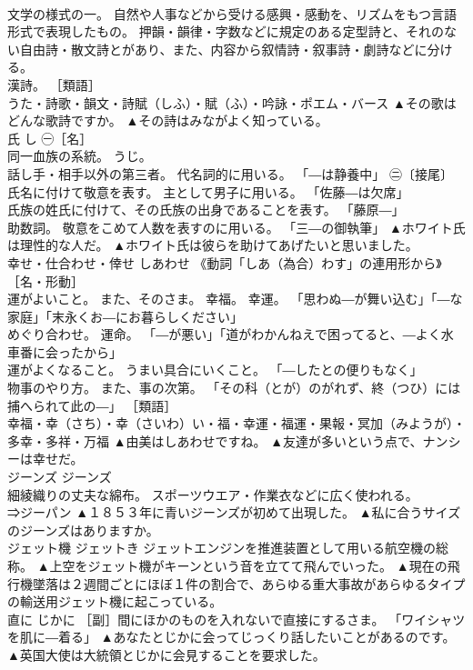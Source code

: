 \documentclass[8pt]{extreport}
\begin{document}
\begin{CJK}{UTF8}{min}
\\	文学の様式の一。 自然や人事などから受ける感興・感動を、リズムをもつ言語形式で表現したもの。 押韻・韻律・字数などに規定のある定型詩と、それのない自由詩・散文詩とがあり、また、内容から叙情詩・叙事詩・劇詩などに分ける。 
\\	漢詩。 ［類語］
\\	うた・詩歌・韻文・詩賦（しふ）・賦（ふ）・吟詠・ポエム・バース	▲その歌はどんな歌詩ですか。 ▲その詩はみながよく知っている。
\\	氏	し	㊀［名］ 
\\	同一血族の系統。 うじ。 
\\	話し手・相手以外の第三者。 代名詞的に用いる。 「―は静養中」 ㊁〔接尾〕 
\\	氏名に付けて敬意を表す。 主として男子に用いる。 「佐藤―は欠席」 
\\	氏族の姓氏に付けて、その氏族の出身であることを表す。 「藤原―」 
\\	助数詞。 敬意をこめて人数を表すのに用いる。 「三―の御執筆」	▲ホワイト氏は理性的な人だ。 ▲ホワイト氏は彼らを助けてあげたいと思いました。
\\	幸せ・仕合わせ・倖せ	しあわせ	《動詞「しあ（為合）わす」の連用形から》［名・形動］ 
\\	運がよいこと。 また、そのさま。 幸福。 幸運。 「思わぬ―が舞い込む」「―な家庭」「末永くお―にお暮らしください」 
\\	めぐり合わせ。 運命。 「―が悪い」「道がわかんねえで困ってると、―よく水車番に会ったから」 
\\	運がよくなること。 うまい具合にいくこと。 「―したとの便りもなく」 
\\	物事のやり方。 また、事の次第。 「その科（とが）のがれず、終（つひ）には捕へられて此の―」 ［類語］
\\	幸福・幸（さち）・幸（さいわ）い・福・幸運・福運・果報・冥加（みようが）・多幸・多祥・万福	▲由美はしあわせですね。 ▲友達が多いという点で、ナンシーは幸せだ。
\\	ジーンズ	ジーンズ	
\\	細綾織りの丈夫な綿布。 スポーツウエア・作業衣などに広く使われる。 
\\	⇒ジーパン	▲１８５３年に青いジーンズが初めて出現した。 ▲私に合うサイズのジーンズはありますか。
\\	ジェット機	ジェットき	ジェットエンジンを推進装置として用いる航空機の総称。	▲上空をジェット機がキーンという音を立てて飛んでいった。 ▲現在の飛行機墜落は２週間ごとにほぼ１件の割合で、あらゆる重大事故があらゆるタイプの輸送用ジェット機に起こっている。
\\	直に	じかに	［副］間にほかのものを入れないで直接にするさま。 「ワイシャツを肌に―着る」	▲あなたとじかに会ってじっくり話したいことがあるのです。 ▲英国大使は大統領とじかに会見することを要求した。

\end{CJK}
\end{document}
